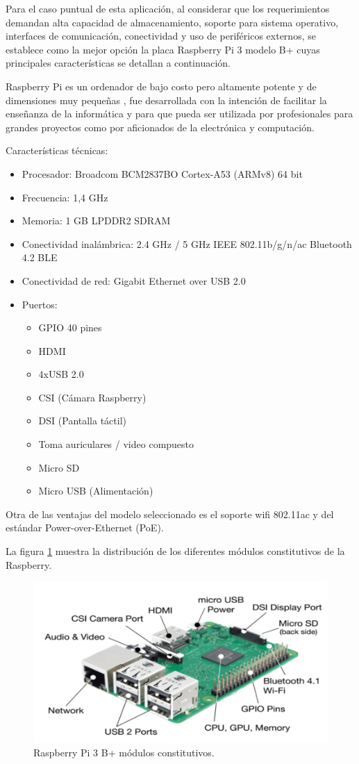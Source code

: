 Para el caso puntual de esta aplicación, al considerar que los requerimientos demandan alta capacidad de almacenamiento, soporte para sistema operativo, interfaces de comunicación, conectividad y uso de periféricos externos, se establece como la mejor opción la placa Raspberry Pi 3 modelo B+ cuyas principales características se detallan a continuación.

Raspberry Pi es un ordenador de bajo costo pero altamente potente y de dimensiones muy pequeñas , fue desarrollada con la intención de facilitar la enseñanza de la informática y para que pueda ser utilizada por profesionales para grandes proyectos como por aficionados de la electrónica y computación.


Características técnicas:
\begin{itemize}
\item Procesador: Broadcom BCM2837BO Cortex-A53 (ARMv8) 64 bit
\item Frecuencia: 1,4 GHz
\item Memoria: 1 GB LPDDR2 SDRAM
\item Conectividad inalámbrica: 2.4 GHz / 5 GHz IEEE 802.11b/g/n/ac Bluetooth 4.2 BLE
\item Conectividad de red: Gigabit Ethernet over USB 2.0
\item Puertos:
\begin{itemize}
\item GPIO 40 pines
\item HDMI
\item 4xUSB 2.0
\item CSI (Cámara Raspberry)
\item DSI (Pantalla táctil)
\item Toma auriculares / video compuesto
\item Micro SD
\item Micro USB (Alimentación) 
\end{itemize}
\end{itemize}
Otra de las ventajas del modelo seleccionado es el soporte wifi 802.11ac y del estándar Power-over-Ethernet (PoE).

La figura \ref{fig:rasp} muestra la distribución de los diferentes módulos constitutivos de la Raspberry.

\begin{figure}[H]
	\centering
	\includegraphics[scale=.8]{./Figures/rasp.pdf}
	\caption{Raspberry Pi 3 B+ módulos constitutivos.}
	\label{fig:rasp}
\end{figure}
 
